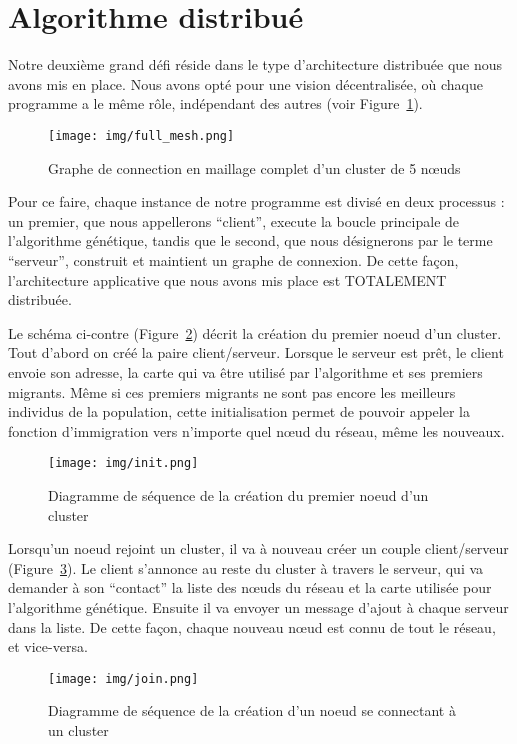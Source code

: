 \documentclass[a4paper]{article}
\begin{document}
\section*{Algorithme distribué}
Notre deuxième grand défi réside dans le type d’architecture distribuée que nous avons mis en place. Nous avons opté pour une vision décentralisée, où chaque programme a le même rôle, indépendant des autres (voir Figure~\ref{full_mesh}). \\

\newpage

\begin{figure}[h]
  \centerline{\texttt{[image: img/full\_mesh.png]}}
  \caption{\label{full_mesh} Graphe de connection en maillage complet d'un cluster de 5 nœuds}
\end{figure}

Pour ce faire, chaque instance de notre programme est divisé en deux processus : un premier, que nous appellerons “client”, execute la boucle principale de l’algorithme génétique, tandis que le second, que nous désignerons par le terme “serveur”, construit et maintient un graphe de connexion. De cette façon, l’architecture applicative que nous avons mis place est TOTALEMENT distribuée. \\

\clearpage

Le schéma ci-contre (Figure~\ref{init}) décrit la création du premier noeud d'un cluster. Tout d'abord on créé la paire client/serveur. Lorsque le serveur est prêt, le client envoie son adresse, la carte qui va être utilisé par l'algorithme et ses premiers migrants. Même si ces premiers migrants ne sont pas encore les meilleurs individus de la population, cette initialisation permet de pouvoir appeler la fonction d'immigration vers n'importe quel nœud du réseau, même les nouveaux. \\

\begin{figure}[h]
  \centerline{\texttt{[image: img/init.png]}}
  \caption{\label{init} Diagramme de séquence de la création du premier noeud d'un cluster}
\end{figure}

\clearpage

Lorsqu’un noeud rejoint un cluster, il va à nouveau créer un couple client/serveur (Figure~\ref{join}). Le client s’annonce au reste du cluster à travers le serveur, qui va demander à son “contact” la liste des nœuds du réseau et la carte utilisée pour l'algorithme génétique. Ensuite il va envoyer un message d'ajout à chaque serveur dans la liste. De cette façon, chaque nouveau nœud est connu de tout le réseau, et vice-versa. \\

\begin{figure}[h]
  \centerline{\texttt{[image: img/join.png]}}
  \caption{\label{join} Diagramme de séquence de la création d’un noeud se connectant à un cluster}
\end{figure}
\end{document}
